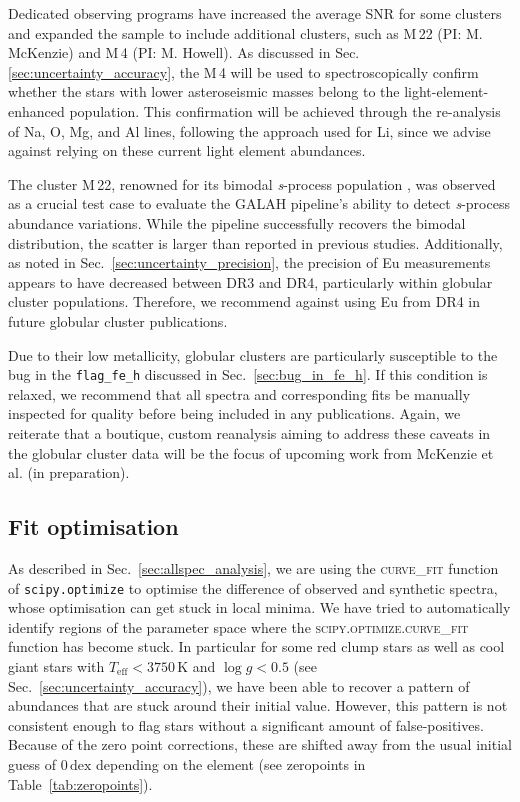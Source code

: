 \documentclass[
  journal=pasa,
  manuscript=research-paper, %
  year=2024,
  volume=37
]{cup-journal}
\begin{document}
Dedicated observing programs have increased the average SNR for some clusters and expanded the sample to include additional clusters, such as M\,22 (PI: M. McKenzie) and M\,4 (PI: M. Howell). As discussed in Sec. \ref{sec:uncertainty_accuracy}, the M\,4 will be used to spectroscopically confirm whether the stars with lower asteroseismic masses belong to the light-element-enhanced population. This confirmation will be achieved through the re-analysis of Na, O, Mg, and Al lines, following the approach used for Li, since we advise against relying on these current light element abundances.

The cluster M\,22, renowned for its bimodal \textit{s}-process population \citep{Marino2011, McKenzie2022, McKenzie2024}, was observed as a crucial test case to evaluate the GALAH pipeline's ability to detect \textit{s}-process abundance variations. While the pipeline successfully recovers the bimodal distribution, the scatter is larger than reported in previous studies. Additionally, as noted in Sec.~\ref{sec:uncertainty_precision}, the precision of Eu measurements appears to have decreased between DR3 and DR4, particularly within globular cluster populations. Therefore, we recommend against using Eu from DR4 in future globular cluster publications.

Due to their low metallicity, globular clusters are particularly susceptible to the bug in the \texttt{flag\_fe\_h} discussed in Sec.~\ref{sec:bug_in_fe_h}. If this condition is relaxed, we recommend that all spectra and corresponding fits be manually inspected for quality before being included in any publications. Again, we reiterate that a boutique, custom reanalysis aiming to address these caveats in the globular cluster data will be the focus of upcoming work from McKenzie et al. (in preparation).

\subsection{Fit optimisation} \label{sec:caveats_fitting}

As described in Sec.~\ref{sec:allspec_analysis}, we are using the \textsc{curve\_fit} function of \texttt{scipy.optimize} \citep{scipy} to optimise the difference of observed and synthetic spectra, whose optimisation can get stuck in local minima. We have tried to automatically identify regions of the parameter space where the \textsc{scipy.optimize.curve\_fit} function has become stuck. In particular for some red clump stars as well as cool giant stars with $T_\mathrm{eff} < 3750\,\mathrm{K}$ and $\log g < 0.5$ (see Sec.~\ref{sec:uncertainty_accuracy}), we have been able to recover a pattern of abundances that are stuck around their initial value. However, this pattern is not consistent enough to flag stars without a significant amount of false-positives. Because of the zero point corrections, these are shifted away from the usual initial guess of $0\,\mathrm{dex}$ depending on the element (see zeropoints in Table~\ref{tab:zeropoints}).
\end{document}
